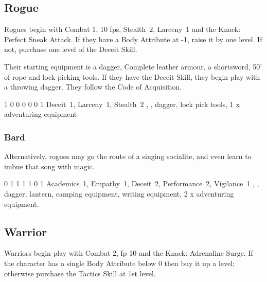 {\begin{multicols}{2}
\subsection{Rogue}

Rogues begin with Combat 1, 10 \glspl{fp}, Stealth~2, Larceny~1 and the Knack: Perfect Sneak Attack.
If they have a Body Attribute at -1, raise it by one level.
If not, purchase one level of the Deceit Skill.

Their starting equipment is a dagger, Complete leather armour, a shortsword, 50' of rope and lock picking tools.
If they have the Deceit Skill, they begin play with a throwing dagger.
They follow the Code of Acquisition.


{1}%
{0}%
{{0}%
{0}%
{0}}%
{0}%
{1}%
{Deceit~1, Larceny~1, Stealth~2\knacks{\perfectsneakattack}}%
{\longsword, \completeleather, dagger, lock pick tools, 1 x adventuring equipment}%
{\addtocounter{fp}{5}}

\subsubsection{Bard}

Alternatively, rogues may go the route of a singing socialite, and even learn to imbue that song with magic.


{0}%
{1}%
{{1}%
{1}%
{1}}%
{0}%
{1}%
{Academics~1, Empathy~1, Deceit~2, Performance~2, Vigilance~1
\knacks{\perfectsneakattack}
}%
{\longsword, \partialleather, dagger, lantern, camping equipment, writing equipment, 2 x adventuring equipment.
}%
{\addtocounter{fp}{5}}

\subsection{Warrior}

Warriors begin play with Combat 2, \gls{fp} 10 and the Knack: Adrenaline Surge.
If the character has a single Body Attribute below 0 then buy it up a level; otherwise purchase the Tactics Skill at 1st level.


\end{multicols}}
